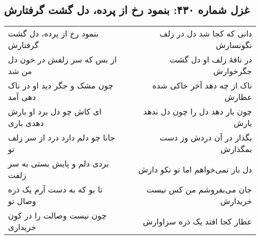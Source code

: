 \begin{center}
\section*{غزل شماره ۴۳۰: بنمود رخ از پرده، دل گشت گرفتارش}
\label{sec:430}
\begin{longtable}{l p{0.5cm} r}
بنمود رخ از پرده، دل گشت گرفتارش
&&
دانی که کجا شد دل در زلف نگونسارش
\\
از بس که سر زلفش در خون دل من شد
&&
در نافهٔ زلف او دل گشت جگرخوارش
\\
چون مشک و جگر دید او در ناک دهی آمد
&&
ناک از چه دهد آخر خاکی شده عطارش
\\
ای کاش چو دل برد او بارش دهدی باری
&&
چون بار دهد دل را چون دل ندهد بارش
\\
جانا چو دلم دارد درد از سر زلف تو
&&
بگذار در آن دردش وز دست بمگذارش
\\
بردی دلم و پایش بستی به سر زلفت
&&
دل باز نمی‌خواهم اما تو نکو دارش
\\
تا بو که به دست آرم یک ذره وصال تو
&&
جان می‌بفروشم من کس نیست خریدارش
\\
چون نیست وصالت را در کون خریداری
&&
عطار کجا افتد یک ذره سزاوارش
\\
\end{longtable}
\end{center}
